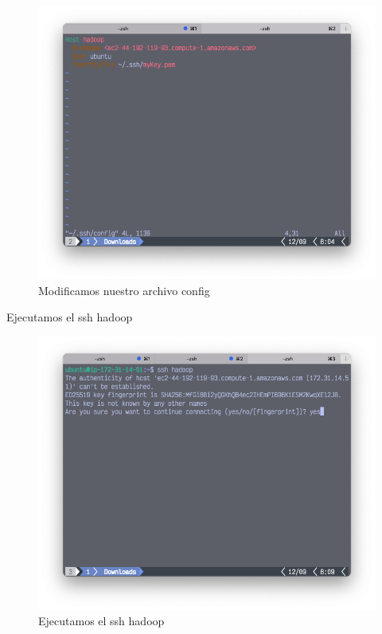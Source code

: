  \clearpage
\begin{figure}[h]
	\centering
	\includegraphics[scale=.35] {img/31-write-host-hadoop}
	\caption{Modificamos nuestro archivo config}
	\label{fig:31}	
\end{figure}

 Ejecutamos el ssh hadoop
 \begin{figure}[h]
	\centering
	\includegraphics[scale=.35] {img/32-ssh-hadoop}
	\caption{Ejecutamos el ssh hadoop}
	\label{fig:32}	
\end{figure}

